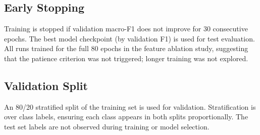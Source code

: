 \subsection{Early Stopping}

Training is stopped if validation macro-F1 does not improve for 30 consecutive
epochs.
The best model checkpoint (by validation F1) is used for test evaluation.
All runs trained for the full 80 epochs in the feature ablation study,
suggesting that the patience criterion was not triggered; longer training was
not explored.

\subsection{Validation Split}

An 80/20 stratified split of the training set is used for validation.
Stratification is over class labels, ensuring each class appears in both
splits proportionally.
The test set labels are not observed during training or model selection.

